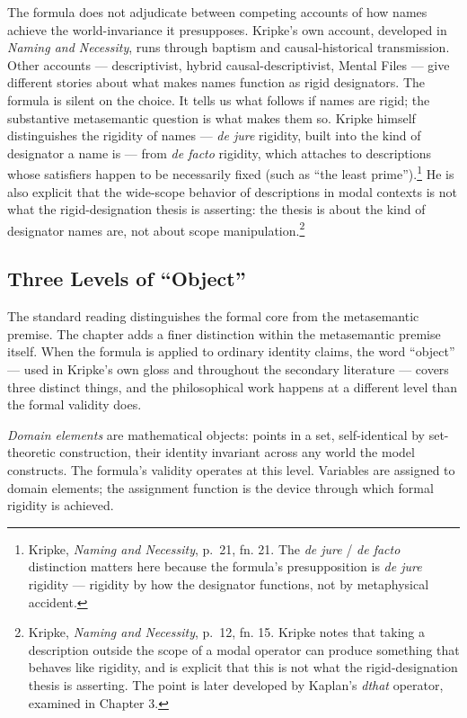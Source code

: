 \documentclass[10pt]{article}
\begin{document}
The formula does not adjudicate between competing accounts of how names achieve the world-invariance it presupposes. Kripke's own account, developed in \emph{Naming and Necessity}, runs through baptism and causal-historical transmission. Other accounts --- descriptivist, hybrid causal-descriptivist, Mental Files --- give different stories about what makes names function as rigid designators. The formula is silent on the choice. It tells us what follows if names are rigid; the substantive metasemantic question is what makes them so. Kripke himself distinguishes the rigidity of names --- \emph{de jure} rigidity, built into the kind of designator a name is --- from \emph{de facto} rigidity, which attaches to descriptions whose satisfiers happen to be necessarily fixed (such as ``the least prime'').\footnote{Kripke, \emph{Naming and Necessity}, p.~21, fn. 21. The \emph{de jure} / \emph{de facto} distinction matters here because the formula's presupposition is \emph{de jure} rigidity --- rigidity by how the designator functions, not by metaphysical accident.} He is also explicit that the wide-scope behavior of descriptions in modal contexts is not what the rigid-designation thesis is asserting: the thesis is about the kind of designator names are, not about scope manipulation.\footnote{Kripke, \emph{Naming and Necessity}, p.~12, fn. 15. Kripke notes that taking a description outside the scope of a modal operator can produce something that behaves like rigidity, and is explicit that this is not what the rigid-designation thesis is asserting. The point is later developed by Kaplan's \emph{dthat} operator, examined in Chapter 3.}

\subsection{Three Levels of ``Object''}\label{three-levels-of-object}

The standard reading distinguishes the formal core from the metasemantic premise. The chapter adds a finer distinction within the metasemantic premise itself. When the formula is applied to ordinary identity claims, the word ``object'' --- used in Kripke's own gloss and throughout the secondary literature --- covers three distinct things, and the philosophical work happens at a different level than the formal validity does.

\emph{Domain elements} are mathematical objects: points in a set, self-identical by set-theoretic construction, their identity invariant across any world the model constructs. The formula's validity operates at this level. Variables are assigned to domain elements; the assignment function is the device through which formal rigidity is achieved.
\end{document}
